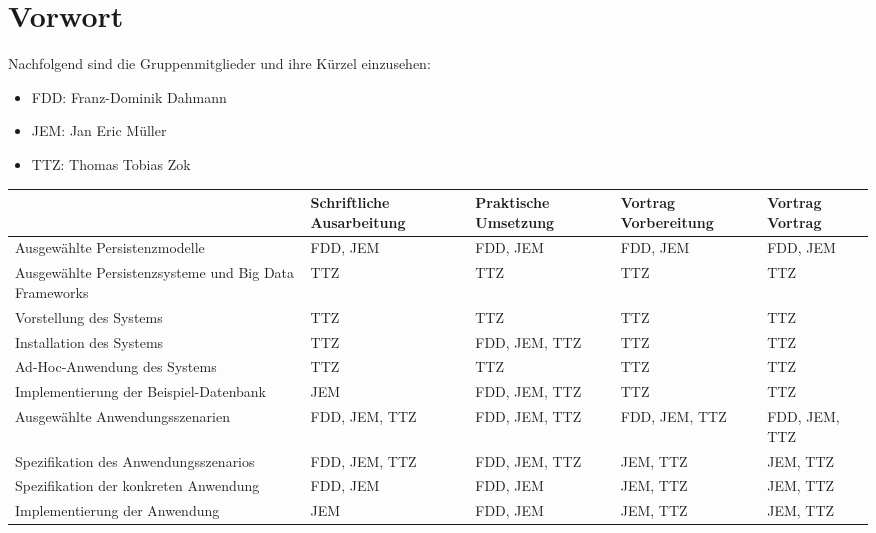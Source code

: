 \chapter{Vorwort}
Nachfolgend sind die Gruppenmitglieder und ihre K\"urzel einzusehen:
\begin{itemize}
\item FDD:    Franz-Dominik Dahmann
\item JEM:    Jan Eric M\"uller
\item TTZ:    Thomas Tobias Zok
\end{itemize}

\begin{table*}[h]
	\begin{tabular}{|p{4cm}|p{2cm}|p{2cm}|p{2cm}|p{2cm}|}
\hline 
	 & Schriftliche Ausarbeitung & Praktische Umsetzung & Vortrag Vorbereitung & Vortrag Vortrag \\ 
\hline 
Ausgewählte Persistenzmodelle & FDD, JEM & FDD, JEM & FDD, JEM & FDD, JEM \\ 
\hline 
Ausgewählte Persistenzsysteme und Big Data Frameworks & TTZ & TTZ & TTZ & TTZ \\ 
\hline 
Vorstellung des Systems & TTZ & TTZ & TTZ & TTZ \\ 
\hline 
Installation des Systems & TTZ & FDD, JEM, TTZ & TTZ & TTZ \\ 
\hline 
Ad-Hoc-Anwendung des Systems & TTZ & TTZ & TTZ & TTZ \\ 
\hline 
Implementierung der Beispiel-Datenbank & JEM & FDD, JEM, TTZ & TTZ & TTZ \\ 
\hline 
Ausgewählte Anwendungsszenarien & FDD, JEM, TTZ & FDD, JEM, TTZ & FDD, JEM, TTZ & FDD, JEM, TTZ \\ 
\hline 
Spezifikation des Anwendungsszenarios & FDD, JEM, TTZ & FDD, JEM, TTZ & JEM, TTZ & JEM, TTZ \\ 
\hline 
Spezifikation der konkreten Anwendung & FDD, JEM & FDD, JEM & JEM, TTZ & JEM, TTZ \\ 
\hline 
Implementierung der Anwendung & JEM & FDD, JEM & JEM, TTZ & JEM, TTZ \\ 
\hline 
	\end{tabular} 
\end{table*}

\cite{edlich01}
\cite{sadalage01}
\cite{redmont01}
\cite{Jing01}
\cite{Bogdan01}
\cite{Meier01}
\cite{Fasel01}
\cite{Meier02}
\cite{Fasel02}
\cite{Boicea01}
\cite{Parker01}
\cite{Abramova01}
\cite{Faraj01}
\cite{Shakuntala01}
\cite{Hows01}
\cite{fowler01}
\cite{harrison01}